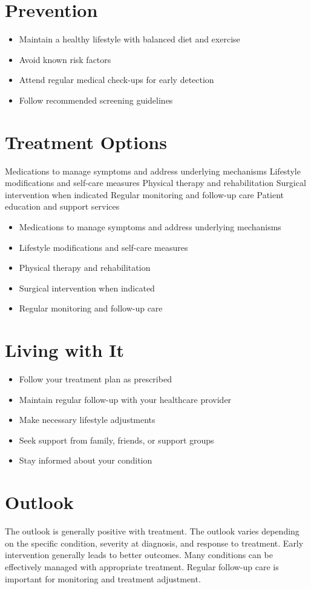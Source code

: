 \section{Prevention}
\begin{itemize}[noitemsep]
  \item Maintain a healthy lifestyle with balanced diet and exercise
  \item Avoid known risk factors
  \item Attend regular medical check-ups for early detection
  \item Follow recommended screening guidelines
\end{itemize}
\section{Treatment Options}
Medications to manage symptoms and address underlying mechanisms Lifestyle modifications and self-care measures Physical therapy and rehabilitation Surgical intervention when indicated Regular monitoring and follow-up care Patient education and support services

\begin{itemize}[noitemsep]
  \item Medications to manage symptoms and address underlying mechanisms
  \item Lifestyle modifications and self-care measures
  \item Physical therapy and rehabilitation
  \item Surgical intervention when indicated
  \item Regular monitoring and follow-up care
\end{itemize}
\section{Living with It}
\begin{itemize}[noitemsep]
  \item Follow your treatment plan as prescribed
  \item Maintain regular follow-up with your healthcare provider
  \item Make necessary lifestyle adjustments
  \item Seek support from family, friends, or support groups
  \item Stay informed about your condition
\end{itemize}
\section{Outlook}
The outlook is generally positive with treatment. The outlook varies depending on the specific condition, severity at diagnosis, and response to treatment. Early intervention generally leads to better outcomes. Many conditions can be effectively managed with appropriate treatment. Regular follow-up care is important for monitoring and treatment adjustment.
